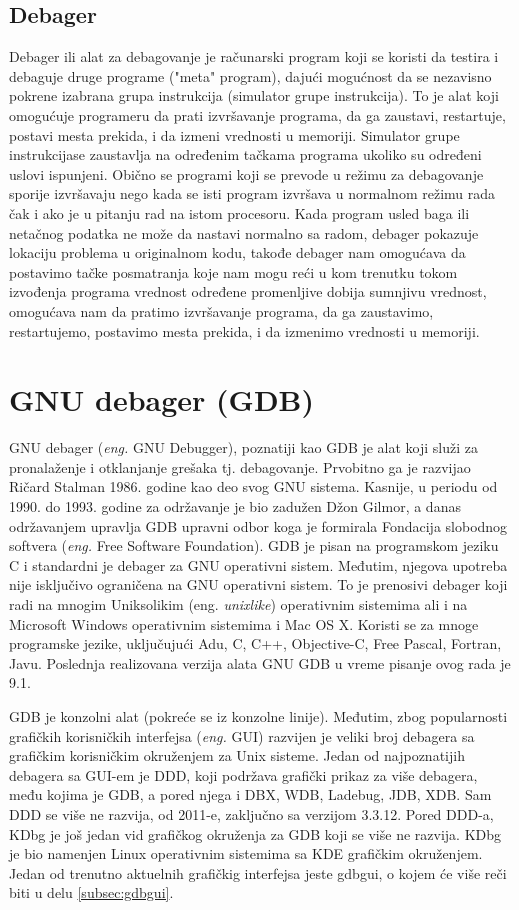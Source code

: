 \documentclass[a4paper]{article}
\begin{document}
\subsection{Debager}
\label{subsec:debager}
Debager ili alat za debagovanje je računarski program koji se koristi da testira i 
debaguje druge programe ("meta" program), dajući mogućnost da se nezavisno 
pokrene izabrana grupa instrukcija (simulator grupe instrukcija).
To je alat koji omogućuje programeru da prati izvršavanje 
programa, da ga zaustavi, restartuje, postavi mesta prekida, i da
izmeni vrednosti u memoriji. Simulator grupe instrukcijase zaustavlja
na određenim tačkama programa ukoliko su određeni uslovi ispunjeni.
Obično se programi koji se prevode u režimu za debagovanje
sporije izvršavaju nego kada se isti program izvršava u normalnom režimu rada čak i ako je 
u pitanju rad na istom procesoru. Kada program usled baga ili netačnog podatka ne može da 
nastavi normalno sa radom, debager pokazuje lokaciju problema u originalnom kodu, takođe
debager nam omogućava da postavimo tačke posmatranja koje nam
mogu reći u kom trenutku tokom izvođenja programa vrednost
određene promenljive dobija sumnjivu vrednost, omogućava nam da
pratimo izvršavanje programa, da ga zaustavimo, restartujemo,
postavimo mesta prekida, i da izmenimo vrednosti u memoriji.

\section{GNU debager (GDB)}
\label{sec:GDB}
GNU debager (\textit{eng.} GNU Debugger), poznatiji kao GDB je alat koji služi za pronalaženje 
i otklanjanje grešaka tj. debagovanje. Prvobitno ga je razvijao Ričard Stalman 1986. godine kao 
deo svog GNU sistema. Kasnije, u periodu od 1990. do 1993. godine za održavanje je bio zadužen 
Džon Gilmor, a danas održavanjem upravlja GDB upravni odbor koga je formirala Fondacija 
slobodnog softvera  (\textit{eng.} Free Software Foundation).
\indent GDB je pisan na programskom jeziku C i standardni je debager za GNU operativni sistem. 
Međutim, njegova upotreba nije isključivo ograničena na GNU operativni sistem. To je prenosivi debager
koji radi na mnogim Uniksolikim (eng. \textit{unixlike}) operativnim sistemima ali i na Microsoft Windows operativnim 
sistemima i Mac OS X. Koristi se za mnoge programske jezike, uključujući
Adu, C, C++, Objective-C, Free Pascal, Fortran, Javu.
Poslednja realizovana verzija alata GNU GDB u vreme pisanje ovog rada je 9.1.

GDB je konzolni alat (pokreće se iz konzolne linije). Međutim, zbog popularnosti grafičkih korisničkih interfejsa
(\textit{eng.} GUI) razvijen je veliki broj debagera sa grafičkim korisničkim okruženjem za Unix sisteme. 
Jedan od najpoznatijih debagera sa GUI-em je DDD, koji podržava grafički prikaz za više debagera, među kojima je
GDB, a pored njega i DBX, WDB, Ladebug, JDB, XDB. Sam DDD se više ne razvija, od 2011-e, zaključno sa verzijom 3.3.12. \cite{GNUOrg}
Pored DDD-a, KDbg je još jedan vid grafičkog okruženja za GDB koji se više ne razvija. KDbg je bio namenjen
Linux operativnim sistemima sa KDE grafičkim okruženjem. Jedan od trenutno aktuelnih grafičkig interfejsa jeste
gdbgui, o kojem će više reči biti u delu \ref{subsec:gdbgui}.
\end{document}
